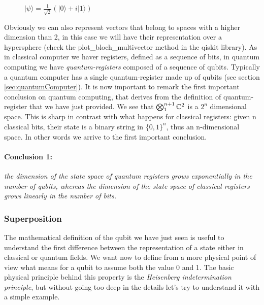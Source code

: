 \documentclass[english]{article}
\newcommand{\sbigotimes}{%
	\mathop{\mathchoice{\textstyle\bigotimes}{\bigotimes}{\bigotimes}{\bigotimes}}%
}
\begin{document}
\begin{enumerate}
\begin{figure}[h]
\begin{minipage}{0.4\textwidth}
							\caption{$|\psi\rangle = \frac{1}{\sqrt{2}}(|0\rangle+i|1\rangle)$}
						\end{minipage}
					\end{figure}
				\end{enumerate}
			
			Obviously we can also represent vectors that belong to spaces with a higher dimension than 2, in this case we will have their representation over a hypersphere (check the plot\_bloch\_multivector method in the qiskit library). As in classical computer we haver registers, defined as a sequence of bits, in quantum computing we have \emph{quantum-registers} composed of a sequence of qubits. Typically a quantum computer has a single quantum-register made up of qubits (see section \ref{sec:quantumComputer}). It is now important to remark the first important conclusion on quantum computing, that derives from the definition of quantum-register that we have just provided. We see that $\sbigotimes_1^{n+1} \mathbb{C}^{2}$ is a $2^{n}$ dimensional space. This is sharp in contrast with what happens for classical registers: given n classical bits, their state is a binary string in $\{0,1\}^{n}$, thus an n-dimensional space. In other words we arrive to the first important conclusion.
			
			\paragraph{Conclusion 1:} \emph{the dimension of the state space of quantum registers grows exponentially in the number of qubits, whereas the dimension of the state space of classical registers grows linearly in the number of bits.}
			
			\subsubsection{Superposition}
			\label{sec:superposition}
				The mathematical definition of the qubit we have just seen is useful to understand the first difference between the representation of a state either in classical or quantum fields. We want now to define from a more physical point of view what means for a qubit to assume both the value 0 and 1. The basic physical principle behind this property is the \emph{Heisenberg indetermination principle}, but without going too deep in the details let's try to understand it with a simple example. 
				
\end{document}
